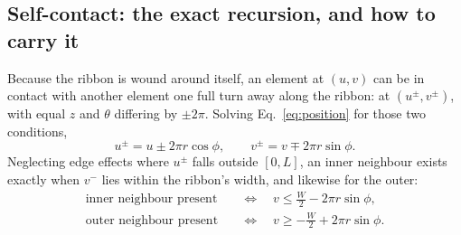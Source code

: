 \documentclass[11pt]{article}
\begin{document}
\subsection{Self-contact: the exact recursion, and how to carry it}
\label{sec:recursion}
Because the ribbon is wound around itself, an element at $(u,v)$ can be in
contact with another element one full turn away along the ribbon: at
$\left(u^{\pm}, v^{\pm}\right)$, with equal $z$ and $\theta$ differing by
$\pm 2\pi$. Solving Eq.~\eqref{eq:position} for those two conditions,
\begin{equation}\label{eq:uv_shift}
    \boxed{\;u^{\pm} = u \pm 2\pi r\cos\phi, \qquad
    v^{\pm} = v \mp 2\pi r\sin\phi.\;}
\end{equation}
Neglecting edge effects where $u^{\pm}$ falls outside $[0,L]$, an inner
neighbour exists exactly when $v^{-}$ lies within the ribbon's width, and
likewise for the outer:
\begin{align}
    \text{inner neighbour present} \quad&\Longleftrightarrow\quad
      v \le \frac{W}{2} - 2\pi r\sin\phi, \label{eq:gate_in}\\
    \text{outer neighbour present} \quad&\Longleftrightarrow\quad
      v \ge -\frac{W}{2} + 2\pi r\sin\phi. \label{eq:gate_out}
\end{align}
\end{document}
